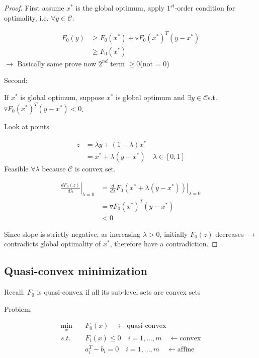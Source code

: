 \begin{proof}
	First assume $x^*$ is the global optimum, apply $1^{st}$-order condition for optimality, i.e. $\forall y \in \mathcal{C}$:
	
	\begin{align*}
	F_0(y) &\geq F_0(x^*) + \triangledown F_0(x^*)^T(y-x^*)\\
	&\geq F_0(x^*)
	\end{align*}
	$\rightarrow$ Basically same prove now $2^{nd}$ term $\geq 0$(not = 0)
	
	Second: 
	
	If $x^*$ is global optimum, suppose $x^*$ is global optimum and $\exists y\in \mathcal{C}$s.t. $\triangledown F_0(x^*)^T(y-x^*)<0$.
	
	Look at points 
	
	\begin{align*}
	z &= \lambda y + (1-\lambda)x^*\\
	&= x^* + \lambda(y-x^*)\quad \lambda \in [0,1]
	\end{align*}
	Feasible $\forall \lambda$ because $\mathcal{C}$ is convex set.
	
	\begin{align*}
	\left.\frac{dF_0(z)}{d\lambda}\right|_{\lambda = 0} &=\left.\frac{d}{d\lambda}F_0(x^*+\lambda(y-x^*))\right|_{\lambda = 0}\\
	&= \triangledown F_0(x^*)^T(y-x^*)\\
	&< 0
	\end{align*}
	
	Since slope is strictly negative, as increasing $\lambda>0$, initially $F_0(z)$ decreases $\rightarrow$ contradicts global optimality of $x^*$, therefore have a contradiction. 
\end{proof}


\subsection{Quasi-convex minimization}

Recall: $F_0$ is quasi-convex if all its sub-level sets are convex sets

Problem:


\begin{align*}
\min_x\quad & F_0(x) \quad \leftarrow \text{quasi-convex}\\
s.t.\quad & F_i(x) \leq 0 \quad i = 1,...,m \quad \leftarrow \text{convex}\\
& a_i^T - b_i = 0\quad i = 1,...,m \quad \leftarrow \text{affine}
\end{align*}

